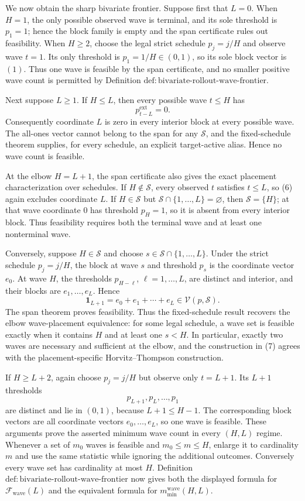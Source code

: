 We now obtain the sharp bivariate frontier.  Suppose first that \(L=0\).  When \(H=1\), the only possible observed wave is terminal, and its sole threshold is \(p_1=1\); hence the block family is empty and the span certificate rules out feasibility.  When \(H\ge2\), choose the legal strict schedule \(p_j=j/H\) and observe wave \(t=1\).  Its only threshold is \(p_1=1/H\in(0,1)\), so its sole block vector is \((1)\).  Thus one wave is feasible by the span certificate, and no smaller positive wave count is permitted by Definition \(\mathrm{def:bivariate\text{-}rollout\text{-}wave\text{-}frontier}\).

Next suppose \(L\ge1\).  If \(H\le L\), then every possible wave \(t\le H\) has
\[
 p^{\mathrm{ext}}_{t-L}=0.
\tag{6}
\]
Consequently coordinate \(L\) is zero in every interior block at every possible wave.  The all-ones vector cannot belong to the span for any \(\mathcal S\), and the fixed-schedule theorem supplies, for every schedule, an explicit target-active alias.  Hence no wave count is feasible.

At the elbow \(H=L+1\), the span certificate also gives the exact placement characterization over schedules.  If \(H\notin\mathcal S\), every observed \(t\) satisfies \(t\le L\), so (6) again excludes coordinate \(L\).  If \(H\in\mathcal S\) but \(\mathcal S\cap\{1,\ldots,L\}=\varnothing\), then \(\mathcal S=\{H\}\); at that wave coordinate \(0\) has threshold \(p_H=1\), so it is absent from every interior block.  Thus feasibility requires both the terminal wave and at least one nonterminal wave.

Conversely, suppose \(H\in\mathcal S\) and choose \(s\in\mathcal S\cap\{1,\ldots,L\}\).  Under the strict schedule \(p_j=j/H\), the block at wave \(s\) and threshold \(p_s\) is the coordinate vector \(e_0\).  At wave \(H\), the thresholds \(p_{H-\ell}\), \(\ell=1,\ldots,L\), are distinct and interior, and their blocks are \(e_1,\ldots,e_L\).  Hence
\[
 \mathbf 1_{L+1}=e_0+e_1+\cdots+e_L
 \in\mathcal V(p,\mathcal S).
\tag{7}
\]
The span theorem proves feasibility.  Thus the fixed-schedule result recovers the elbow wave-placement equivalence: for some legal schedule, a wave set is feasible exactly when it contains \(H\) and at least one \(s<H\).  In particular, exactly two waves are necessary and sufficient at the elbow, and the construction in (7) agrees with the placement-specific Horvitz--Thompson construction.

If \(H\ge L+2\), again choose \(p_j=j/H\) but observe only \(t=L+1\).  Its \(L+1\) thresholds
\[
 p_{L+1},p_L,\ldots,p_1
\]
are distinct and lie in \((0,1)\), because \(L+1\le H-1\).  The corresponding block vectors are all coordinate vectors \(e_0,\ldots,e_L\), so one wave is feasible.  These arguments prove the asserted minimum wave count in every \((H,L)\) regime.  Whenever a set of \(m_0\) waves is feasible and \(m_0\le m\le H\), enlarge it to cardinality \(m\) and use the same statistic while ignoring the additional outcomes.  Conversely every wave set has cardinality at most \(H\).  Definition \(\mathrm{def:bivariate\text{-}rollout\text{-}wave\text{-}frontier}\) now gives both the displayed formula for \(\mathcal F_{\mathrm{wave}}(L)\) and the equivalent formula for \(m_{\min}^{\mathrm{wave}}(H,L)\).

